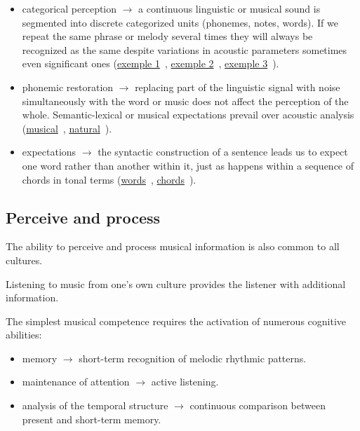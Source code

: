 \begin{itemize}
\tightlist\item categorical perception \(\rightarrow\) a continuous linguistic or musical sound is segmented into discrete categorized units (phonemes, notes, words). If we repeat the same phrase or melody several times they will always be recognized as the same despite variations in acoustic parameters sometimes even significant ones (\href{http://www.musicaecodice.it/on_server/media/1_media/pollini.mp3}{exemple 1}~\cite{chop_1}, \href{http://www.musicaecodice.it/on_server/media/1_media/kissin.mp3}{exemple 2}~\cite{chop_2}, \href{http://www.musicaecodice.it/on_server/media/1_media/sokolov.mp3}{exemple 3}~\cite{chop_3}).
\item phonemic restoration \(\rightarrow\) replacing part of the linguistic signal with noise simultaneously with the word or music does not affect the perception of the whole. Semantic-lexical or musical expectations prevail over acoustic analysis (\href{http://www.musicaecodice.it/on_server/media/1_media/buchi.mp3}{musical}~\cite{chop_3}, \href{http://www.musicaecodice.it/on_server/media/1_media/vian.mp3}{natural}~\cite{gass_1}).
\item expectations \(\rightarrow\) the syntactic construction of a sentence leads us to expect one word rather than another within it, just as happens within a sequence of chords in tonal terms (\href{http://www.musicaecodice.it/on_server/media/1_media/analisi.mp3}{words}~\cite{gass_2}, \href{http://www.musicaecodice.it/on_server/media/1_media/accordi.mp3}{chords}~\cite{tchai}).
\end{itemize}

\subsection{Perceive and process }\label{perceive-and-process}

The ability to perceive and process musical information is also common to all cultures.

Listening to music from one's own culture provides the listener with additional information.

The simplest musical competence requires the activation of numerous cognitive abilities: 

\begin{itemize}
\tightlist\item memory \(\rightarrow\) short-term recognition of melodic rhythmic patterns.
\item maintenance of attention \(\rightarrow\) active listening.
\item analysis of the temporal structure \(\rightarrow\) continuous comparison between present and short-term memory.
\end{itemize}

